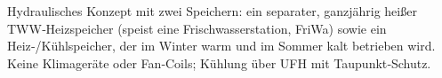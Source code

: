 \markdownRendererDocumentBegin
\markdownRendererSectionBegin
{}\markdownRendererInterblockSeparator
{}Hydraulisches Konzept mit zwei Speichern: ein separater, ganzjährig heißer TWW‑Heizspeicher (speist eine Frischwasserstation, FriWa) sowie ein Heiz‑/Kühlspeicher, der im Winter warm und im Sommer kalt betrieben wird. Keine Klimageräte oder Fan‑Coils; Kühlung über UFH mit Taupunkt‑Schutz.\markdownRendererInterblockSeparator
{}\markdownRendererSectionBegin
{}
\markdownRendererSectionEnd 
\markdownRendererSectionEnd \markdownRendererDocumentEnd